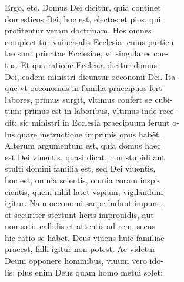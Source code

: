\documentclass{article}
\begin{document}
\begin{pages}
                Ergo, etc. Domus Dei dicitur, quia continet \\
                domesticos Dei, hoc est, electos et pios, qui \\
                profitentur veram doctrinam. Hos omnes \\
                complectitur vniuersalis Ecclesia, cuius particu \\
                lae sunt priuatae Ecclesiae, vt singulares coe- \\
                tus. Et qua ratione Ecclesia dicitur domus \\
                Dei, eadem ministri dicuntur oeconomi Dei. Ita- \\
                que vt oeconomus in familia praecipuos fert \\
                labores, primus surgit, vltimus confert se cubi- \\
                tum: primus est in laboribus, vltimus inde rece- \\
                dit: sic ministri in Ecclesia praecipuum ferunt o- \\
                lus,quare instructione imprimis opus habẽt. \\
                Alterum argumentum est, quia domus haec \\
                est Dei viuentis, quasi dicat, non stupidi aut \\
                stulti domini familia est, sed Dei viuentis, \\
                hoc est, omnia scientis, omnia coram inspi- \\
                cientis, quem nihil latet vspiam, vigilandum \\
                igitur. Nam oeconomi saepe ludunt impune, \\
                et securiter stertunt heris improuidis, aut \\
                non satis callidis et attentis ad rem, secus \\
                hic ratio se habet. Deus viuens huic familiae \\
                praeest, falli igitur non potest. Ac videtur \\
                Deum opponere hominibus, viuum vero ido- \\
                lis: plus enim Deus quam homo metui solet: \\

\end{pages}
\end{document}
